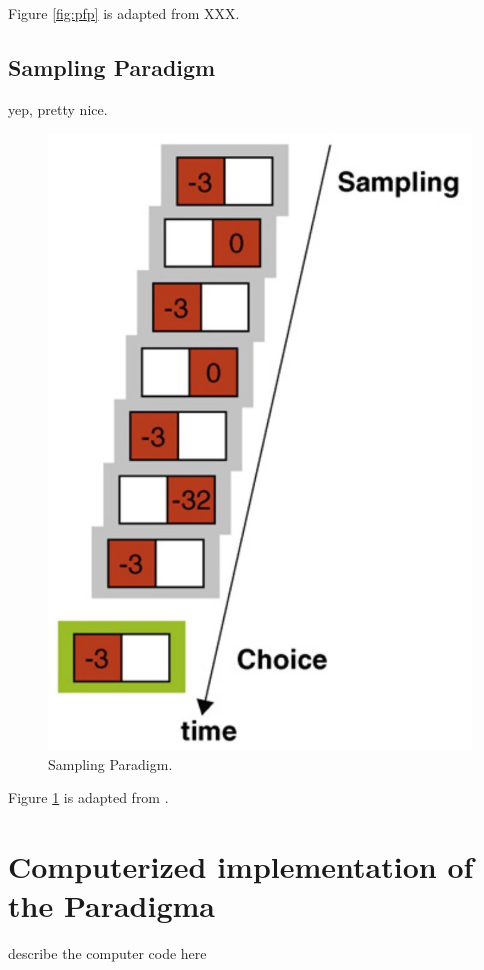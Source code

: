 \documentclass[
	12pt,
	oneside,
	bibliography=totocnumbered]{scrartcl}
\begin{document}
Figure \ref{fig:pfp} is adapted from XXX.




\subsection{Sampling Paradigm}
yep, pretty nice.


\begin{figure}[h]
	\centering
	\includegraphics[scale=0.3]{sp.jpg}
	\caption{Sampling Paradigm.}
	\label{fig:sp}
\end{figure}

Figure \ref{fig:sp} is adapted from \cite{hertwig2009}.


\section{Computerized implementation of the Paradigma}
describe the computer code here


\printbibliography
\end{document}
